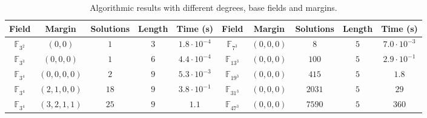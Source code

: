 \documentclass[11pt]{article}
\begin{document}
\begin{table}
  \centering
  \footnotesize
  \begin{tabular}{|c|c|c|c|c||c|c|c|c|c|}
    \hline
    Field & Margin & Solutions & Length & Time (s) & Field & Margin
    & Solutions & Length & Time (s) \\
    \hline
    \hline
    $\mathbb{F}_{3^2}$ & $(0, 0)$ & $1$ & $3$ & $1.8\cdot10^{-4}$ & $\mathbb{F}_{7^3}$ & $(0, 0, 0)$
    & $8$ & $5$ & $7.0\cdot10^{-3}$\\ 
    \hline
    $\mathbb{F}_{3^3}$ & $(0, 0, 0)$ & $1$ & $6$ & $4.4\cdot10^{-4}$ & $\mathbb{F}_{13^3}$ & $(0, 0, 0)$
    & $100$ & $5$ & $2.9\cdot10^{-1}$\\ 
    \hline
    $\mathbb{F}_{3^4}$ & $(0, 0, 0, 0)$ & $2$ & $9$ & $5.3\cdot10^{-3}$ & $\mathbb{F}_{19^3}$ & $(0, 0, 0)$
    & $415$ & $5$ & $1.8$\\ 
    \hline
    $\mathbb{F}_{3^4}$ & $(2, 1, 0, 0)$ & $18$ & $9$ & $3.8\cdot10^{-1}$ &
    $\mathbb{F}_{31^3}$ & $(0, 0, 0)$
    & $2031$ & $5$ & $29$\\ 
    \hline
    $\mathbb{F}_{3^4}$ & $(3, 2, 1, 1)$ & $25$ & $9$ & $1.1$ & $\mathbb{F}_{47^3}$ & $(0, 0, 0)$
    & $7590$ & $5$ & $360$\\ 
    \hline
  \end{tabular}
  \caption{Algorithmic results with different degrees, base fields and margins.}
  \label{tab:alg}
\end{table}
\end{document}
